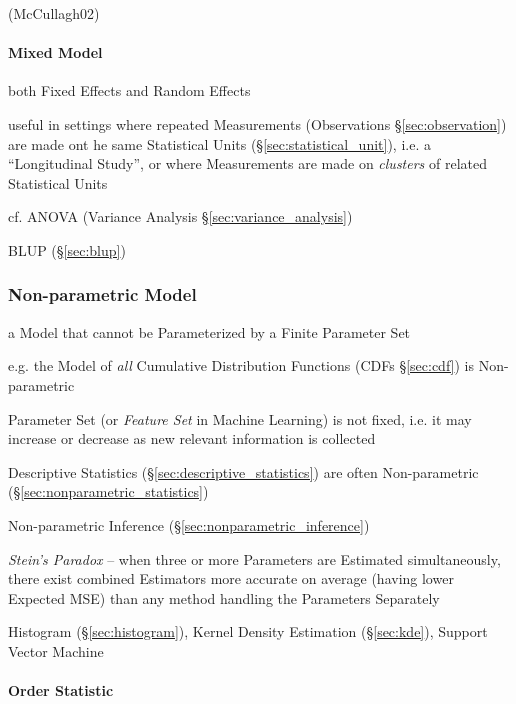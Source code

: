 (McCullagh02)



\paragraph{Mixed Model}\label{sec:mixed_model}\hfill

both Fixed Effects and Random Effects

useful in settings where repeated Measurements (Observations
\S\ref{sec:observation}) are made ont he same Statistical Units
(\S\ref{sec:statistical_unit}), i.e. a ``Longitudinal Study'', or where
Measurements are made on \emph{clusters} of related Statistical Units

cf. ANOVA (Variance Analysis \S\ref{sec:variance_analysis})

BLUP (\S\ref{sec:blup})



\subsubsection{Non-parametric Model}\label{sec:nonparametric_model}

a Model that cannot be Parameterized by a Finite Parameter Set

e.g. the Model of \emph{all} Cumulative Distribution Functions (CDFs
\S\ref{sec:cdf}) is Non-parametric

Parameter Set (or \emph{Feature Set} in Machine Learning) is not fixed, i.e. it
may increase or decrease as new relevant information is collected

Descriptive Statistics (\S\ref{sec:descriptive_statistics}) are often
Non-parametric (\S\ref{sec:nonparametric_statistics})

\fist Non-parametric Inference (\S\ref{sec:nonparametric_inference})

\emph{Stein's Paradox} -- when three or more Parameters are Estimated
simultaneously, there exist combined Estimators more accurate on average (having
lower Expected MSE) than any method handling the Parameters Separately

Histogram (\S\ref{sec:histogram}), Kernel Density Estimation (\S\ref{sec:kde}),
Support Vector Machine



\paragraph{Order Statistic}\label{sec:order_statistic}\hfill

